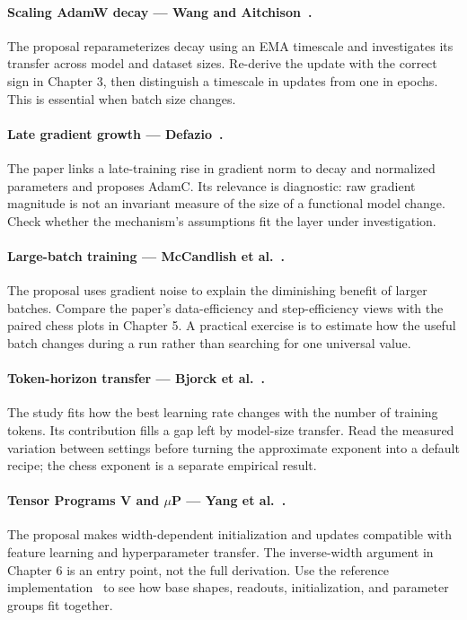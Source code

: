 \paragraph{Scaling AdamW decay --- Wang and Aitchison~\cite{wdscale}.}
The proposal reparameterizes decay using an EMA timescale and investigates its transfer across model and dataset sizes. Re-derive the update with the correct sign in Chapter 3, then distinguish a timescale in updates from one in epochs. This is essential when batch size changes.

\paragraph{Late gradient growth --- Defazio~\cite{gradtail}.}
The paper links a late-training rise in gradient norm to decay and normalized parameters and proposes AdamC. Its relevance is diagnostic: raw gradient magnitude is not an invariant measure of the size of a functional model change. Check whether the mechanism's assumptions fit the layer under investigation.

\paragraph{Large-batch training --- McCandlish et al.~\cite{largebatch}.}
The proposal uses gradient noise to explain the diminishing benefit of larger batches. Compare the paper's data-efficiency and step-efficiency views with the paired chess plots in Chapter 5. A practical exercise is to estimate how the useful batch changes during a run rather than searching for one universal value.

\paragraph{Token-horizon transfer --- Bjorck et al.~\cite{horizon}.}
The study fits how the best learning rate changes with the number of training tokens. Its contribution fills a gap left by model-size transfer. Read the measured variation between settings before turning the approximate exponent into a default recipe; the chess exponent is a separate empirical result.

\paragraph{Tensor Programs V and $\mu$P --- Yang et al.~\cite{mup}.}
The proposal makes width-dependent initialization and updates compatible with feature learning and hyperparameter transfer. The inverse-width argument in Chapter 6 is an entry point, not the full derivation. Use the reference implementation~\cite{mupcode} to see how base shapes, readouts, initialization, and parameter groups fit together.

